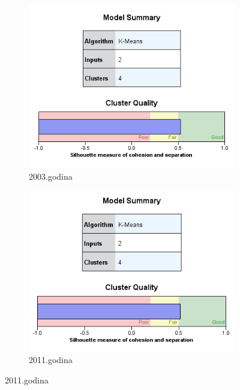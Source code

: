 \documentclass[a4paper]{article}
\begin{document}
\begin{figure}[H]
	\begin{subfigure}[h]{0.45\textwidth}
		\begin{center}
			\includegraphics[scale=0.50]{Klasterovanje/Model_KMeans2003_Silhouette.png}
		\end{center}
		\caption{2003.godina}
		\label{fig:SPSS_Silueta2003}
	\end{subfigure}
	\hfill
	\begin{subfigure}[h]{0.45\textwidth}
		\begin{center}
			\includegraphics[scale=0.50]{Klasterovanje/Model_KMeans2011_Silhouette.png}
		\end{center}
		\caption{2011.godina}
		\label{fig:SPSS_Silueta2011}
	\end{subfigure}


\end{figure}
\end{document}
